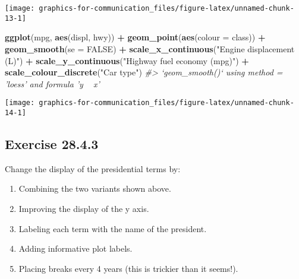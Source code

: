 \documentclass[]{book}
\newenvironment{Shaded}{\begin{snugshade}}{\end{snugshade}}
\newcommand{\CommentTok}[1]{\textcolor[rgb]{0.56,0.35,0.01}{\textit{#1}}}
\newcommand{\DataTypeTok}[1]{\textcolor[rgb]{0.13,0.29,0.53}{#1}}
\newcommand{\KeywordTok}[1]{\textcolor[rgb]{0.13,0.29,0.53}{\textbf{#1}}}
\newcommand{\NormalTok}[1]{#1}
\newcommand{\OperatorTok}[1]{\textcolor[rgb]{0.81,0.36,0.00}{\textbf{#1}}}
\newcommand{\OtherTok}[1]{\textcolor[rgb]{0.56,0.35,0.01}{#1}}
\newcommand{\StringTok}[1]{\textcolor[rgb]{0.31,0.60,0.02}{#1}}
\providecommand{\tightlist}{%
  \setlength{\itemsep}{0pt}\setlength{\parskip}{0pt}}
\theoremstyle{plain}
\theoremstyle{remark}
\theoremstyle{definition}
\theoremstyle{definition}
\theoremstyle{definition}
\theoremstyle{remark}
\begin{document}
\begin{center}\texttt{[image: graphics-for-communication\_files/figure-latex/unnamed-chunk-13-1]} \end{center}

\begin{Shaded}
\begin{Highlighting}[]
\KeywordTok{ggplot}\NormalTok{(mpg, }\KeywordTok{aes}\NormalTok{(displ, hwy)) }\OperatorTok{+}
\StringTok{  }\KeywordTok{geom_point}\NormalTok{(}\KeywordTok{aes}\NormalTok{(}\DataTypeTok{colour =}\NormalTok{ class)) }\OperatorTok{+}
\StringTok{  }\KeywordTok{geom_smooth}\NormalTok{(}\DataTypeTok{se =} \OtherTok{FALSE}\NormalTok{) }\OperatorTok{+}
\StringTok{  }\KeywordTok{scale_x_continuous}\NormalTok{(}\StringTok{"Engine displacement (L)"}\NormalTok{) }\OperatorTok{+}
\StringTok{  }\KeywordTok{scale_y_continuous}\NormalTok{(}\StringTok{"Highway fuel economy (mpg)"}\NormalTok{) }\OperatorTok{+}
\StringTok{  }\KeywordTok{scale_colour_discrete}\NormalTok{(}\StringTok{"Car type"}\NormalTok{)}
\CommentTok{#> `geom_smooth()` using method = 'loess' and formula 'y ~ x'}
\end{Highlighting}
\end{Shaded}

\begin{center}\texttt{[image: graphics-for-communication\_files/figure-latex/unnamed-chunk-14-1]} \end{center}

\hypertarget{exercise-28.4.3}{%
\subsection*{\texorpdfstring{Exercise
{28.4.3}}{Exercise 28.4.3}}\label{exercise-28.4.3}}

Change the display of the presidential terms by:

\begin{enumerate}
\def\labelenumi{\arabic{enumi}.}
\tightlist
\item
  Combining the two variants shown above.
\item
  Improving the display of the y axis.
\item
  Labeling each term with the name of the president.
\item
  Adding informative plot labels.
\item
  Placing breaks every 4 years (this is trickier than it seems!).
\end{enumerate}
\end{document}
